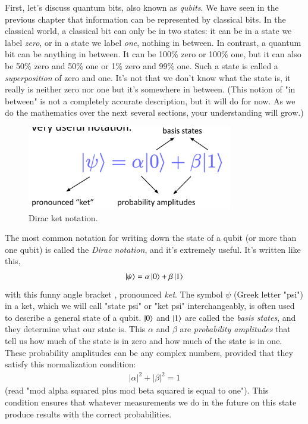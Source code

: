 First, let's discuss quantum bits, also known as \emph{qubits}. We have seen in the previous chapter that information can be represented by classical bits. In the classical world, a classical bit can only be in two states: it can be in a state we label \emph{zero}, or in a state we label \emph{one}, nothing in between. In contrast, a quantum bit can be anything in between. It can be 100\% zero or 100\% one, but it can also be 50\% zero and 50\% one or 1\% zero and 99\% one. Such a state is called a \emph{superposition} of zero and one. It's not that we don't know what the state is, it really is neither zero nor one but it's somewhere in between. (This notion of "in between" is not a completely accurate description, but it will do for now.  As we do the mathematics over the next several sections, your understanding will grow.)

\begin{figure}[H]
    \centering
    \includegraphics[width=0.8\textwidth]{lesson2/dirac_notation.pdf}
    
        \caption{Dirac ket notation. }
    
    \label{fig:ket-notation}
\end{figure}

The most common notation for writing down the state of a qubit (or more than one qubit) is called the \emph{Dirac notation}, and it's extremely useful. It's written like this,
\begin{align}
\left| \psi \right\rangle = \alpha\left| 0 \right\rangle + \beta\left| 1 \right\rangle
\end{align}
with this funny angle bracket \ket{}, pronounced \emph{ket}. The symbol $\psi$ (Greek letter "psi") in a ket, which we will call "state psi" or "ket psi" interchangeably, is often used to describe a general state of a qubit. $\left| 0 \right\rangle$ and $\left| 1 \right\rangle$ are called the \emph{basis states}, and they determine what our state is. This $\alpha$ and $\beta$ are \emph{probability amplitudes} that tell us how much of the state is in zero and how much of the state is in one.  These probability amplitudes can be any complex numbers, provided that they satisfy this normalization condition:
\begin{align}
    |\alpha|^2 + |\beta|^2 = 1
    \label{eq:normalization-condition}
\end{align}
(read "mod alpha squared plus mod beta squared is equal to one"). This condition ensures that whatever measurements we do in the future on this state produce results with the correct probabilities.


